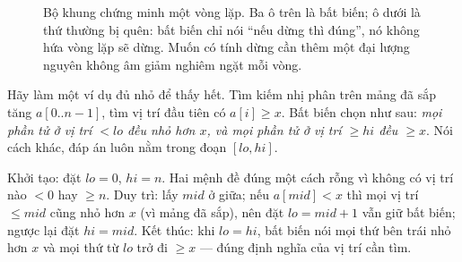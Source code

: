 \documentclass[../../algorithm.tex]{subfiles}
\begin{document}
\begin{figure}[H]\centering
{}
\caption{Bộ khung chứng minh một vòng lặp. Ba ô trên là bất biến; ô dưới là thứ thường bị quên: bất biến chỉ nói ``nếu dừng thì đúng'', nó không hứa vòng lặp sẽ dừng. Muốn có tính dừng cần thêm một đại lượng nguyên không âm giảm nghiêm ngặt mỗi vòng.}
\label{fig:invariant}
\end{figure}

Hãy làm một ví dụ đủ nhỏ để thấy hết. Tìm kiếm nhị phân trên mảng đã sắp tăng \(a[0..n-1]\), tìm vị trí đầu tiên có \(a[i] \ge x\). Bất biến chọn như sau: \emph{mọi phần tử ở vị trí \(< lo\) đều nhỏ hơn \(x\), và mọi phần tử ở vị trí \(\ge hi\) đều \(\ge x\)}. Nói cách khác, đáp án luôn nằm trong đoạn \([lo, hi]\).

Khởi tạo: đặt \(lo = 0\), \(hi = n\). Hai mệnh đề đúng một cách rỗng vì không có vị trí nào \(<0\) hay \(\ge n\). Duy trì: lấy \(mid\) ở giữa; nếu \(a[mid] < x\) thì mọi vị trí \(\le mid\) cũng nhỏ hơn \(x\) (vì mảng đã sắp), nên đặt \(lo = mid+1\) vẫn giữ bất biến; ngược lại đặt \(hi = mid\). Kết thúc: khi \(lo = hi\), bất biến nói mọi thứ bên trái nhỏ hơn \(x\) và mọi thứ từ \(lo\) trở đi \(\ge x\) --- đúng định nghĩa của vị trí cần tìm.
\end{document}
